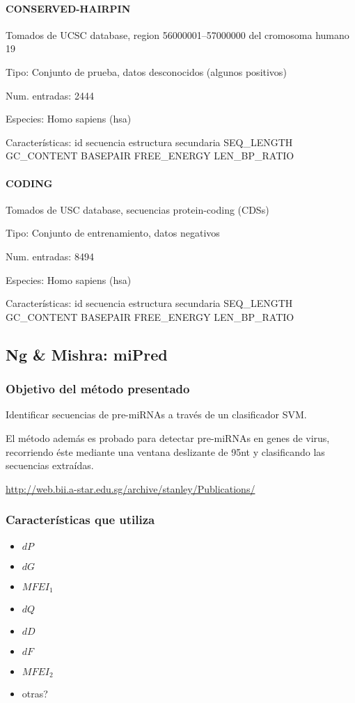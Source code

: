 \documentclass[12pt,bibliography=openstyle,DIV=12,parskip=half-]{scrartcl}
\begin{document}
\paragraph{CONSERVED-HAIRPIN}
Tomados de UCSC database, region 56000001--57000000 del cromosoma
humano 19
\begin{description*}
\item[Tipo:] Conjunto de prueba, datos desconocidos (algunos
  positivos)
\item[Num. entradas:] 2444
\item[Especies:]  Homo sapiens (hsa)
\item[Características:]
id \quad
secuencia \quad
estructura secundaria \quad
SEQ\_LENGTH \quad
GC\_CONTENT \quad
BASEPAIR \quad
FREE\_ENERGY \quad
LEN\_BP\_RATIO
\end{description*}
\paragraph{CODING}
Tomados de USC database, secuencias protein-coding (CDSs)
\begin{description*}
\item[Tipo:] Conjunto de entrenamiento, datos negativos
\item[Num. entradas:] 8494
\item[Especies:]  Homo sapiens (hsa)
\item[Características:]
id \quad
secuencia \quad
estructura secundaria \quad
SEQ\_LENGTH \quad
GC\_CONTENT \quad
BASEPAIR \quad
FREE\_ENERGY \quad
LEN\_BP\_RATIO
\end{description*}
%
%
%
%
%
\subsection{Ng \& Mishra: miPred}
\subsubsection{Objetivo del método presentado}
Identificar secuencias de pre-miRNAs a través de un clasificador SVM.

El método además es probado para detectar pre-miRNAs en genes de
virus, recorriendo éste mediante una ventana deslizante de 95nt y
clasificando las secuencias extraídas.

\url{http://web.bii.a-star.edu.sg/archive/stanley/Publications/}
\subsubsection{Características que utiliza}
\begin{itemize}
\item $dP$
\item $dG$
\item $MFEI_1$
\item $dQ$
\item $dD$
\item $dF$
\item $MFEI_2$
\item otras?
\end{itemize}
\end{document}
